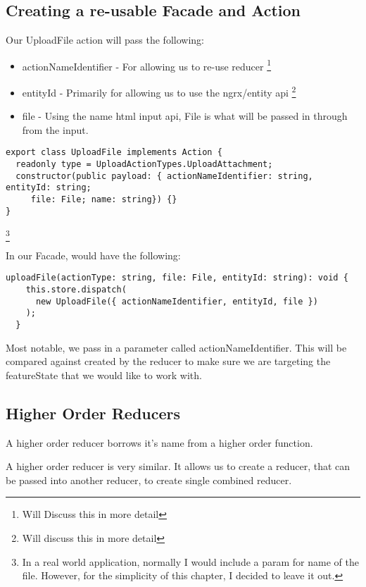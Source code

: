 \subsection{Creating a re-usable Facade and Action}
Our UploadFile action will pass the following:
\begin{itemize}
  \item actionNameIdentifier - For allowing us to re-use reducer
  \footnote{Will Discuss this in more detail}
  \item entityId - Primarily for allowing us to use the ngrx/entity api
  \footnote{Will discuss this in more detail}
  \item file - Using the name html input api, File is what will be passed in
  through from the input.
\end{itemize}
\begin{lstlisting}
export class UploadFile implements Action {
  readonly type = UploadActionTypes.UploadAttachment;
  constructor(public payload: { actionNameIdentifier: string, entityId: string;
     file: File; name: string}) {}
}
\end{lstlisting}
\footnote{In a real world application, normally I would include a param for name
of the file. However, for the simplicity of this chapter, I decided to leave
it out.}

In our Facade, would have the following:

\begin{lstlisting}
uploadFile(actionType: string, file: File, entityId: string): void {
    this.store.dispatch(
      new UploadFile({ actionNameIdentifier, entityId, file })
    );
  }
\end{lstlisting}

Most notable, we pass in a parameter called actionNameIdentifier. This will be
compared against created by the reducer to make sure we are targeting the
featureState that we would like to work with.

\subsection{Higher Order Reducers}

A higher order reducer borrows it's name from a higher order function.


A higher order reducer is very similar. It allows us to create a reducer, that
can be passed into another reducer, to create single combined reducer.

